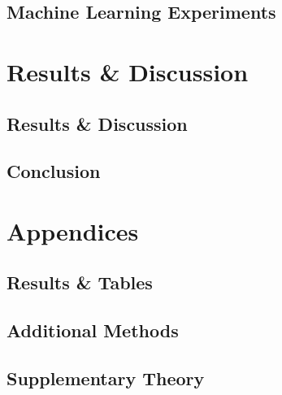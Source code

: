 \documentclass[a4paper, USenglish, 11pt]{report}
\begin{document}
\chapter{Machine Learning Experiments}



\part{Results \& Discussion}
\chapter{Results \& Discussion}


% 

\chapter{Conclusion}



\part{Appendices}
\appendix
\chapter{Results \& Tables}\label{sec:appendix_a}


\chapter{Additional Methods}\label{sec:appendix_b}

\chapter{Supplementary Theory}
\label{sec:appendix_c}

\newpage


\end{document}
